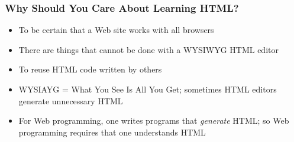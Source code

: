 \documentclass[dvipsnames,handout]{beamer}
\begin{document}
\begin{frame}
\frametitle{Why Should You Care About Learning HTML?}

\begin{itemize}
  
\item To be certain that a Web site works with all browsers
  
\item There are things that cannot be done with a WYSIWYG HTML editor
  
\item To reuse HTML code written by others
  
\item WYSIAYG = What You See Is All You Get; sometimes HTML editors
  generate unnecessary HTML
  
\item For Web programming, one writes programs that \emph{generate}
  HTML; so Web programming requires that one understands HTML

\end{itemize}
\end{frame}




\end{document}
